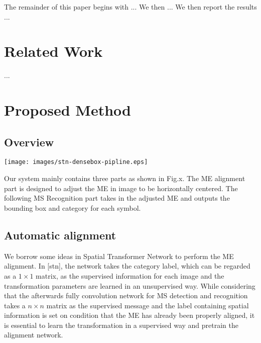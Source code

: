 \documentclass[10pt,conference,a4paper]{IEEEtran}
\begin{document}
	The remainder of this paper begins with ... We then ... We then report the results ...
		
	\section{Related Work}
	...
	
	\section{Proposed Method}
	\subsection{Overview}
	\begin{figure*}
		\centering
		\texttt{[image: images/stn-densebox-pipline.eps]}
	\end{figure*}
	Our system mainly contains three parts as shown in Fig.x. The ME alignment part is designed to adjust the ME in image to be horizontally centered. The following MS Recognition part takes in the adjusted ME and outputs the bounding box and category for each symbol. 
	\subsection{Automatic alignment}
	We borrow some ideas in Spatial Transformer Network to perform the ME alignment. In [stn], the network takes the category label, which can be regarded as a $1 \times 1$ matrix, as the supervised information for each image and the transformation parameters are learned in an unsupervised way. While considering that the afterwards fully convolution network for MS detection and recognition takes a $n \times n$ matrix as the supervised message and the label containing spatial information is set on condition that the ME has already been properly aligned, it is essential to learn the transformation in a supervised way and pretrain the alignment network.
	
\end{document}
